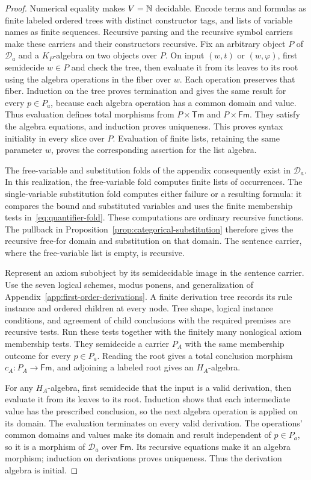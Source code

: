 \begin{proof}
Numerical equality makes $V=\mathbb N$ decidable. Encode terms and formulas
as finite labeled ordered trees with distinct constructor tags,
and lists of variable names as finite sequences. Recursive parsing
and the recursive symbol carriers make these carriers and their
constructors recursive. Fix an arbitrary object $P$ of $\mathcal D_a$
and a $K_P$-algebra on two objects over $P$. On input $(w,t)$ or
$(w,\varphi)$, first semidecide $w\in P$ and check the tree, then
evaluate it from its leaves to its root using the algebra operations
in the fiber over $w$. Each operation preserves that fiber.
Induction on the tree proves termination and gives the same result
for every $p\in P_a$, because each algebra operation has a common
domain and value. Thus evaluation defines total morphisms from
$P\times\mathsf{Tm}$ and $P\times\mathsf{Fm}$. They satisfy the algebra
equations, and induction
proves uniqueness. This proves syntax initiality in every slice
over $P$. Evaluation of finite lists, retaining the same parameter
$w$, proves the corresponding assertion for the list algebra.

The free-variable and substitution folds of the appendix consequently
exist in $\mathcal D_a$. In this realization, the free-variable fold
computes finite lists of occurrences. The single-variable
substitution fold computes either failure or a resulting formula:
it compares the bound and substituted variables and uses the finite
membership tests in~\eqref{eq:quantifier-fold}. These computations
are ordinary recursive functions. The pullback in
Proposition~\ref{prop:categorical-substitution} therefore gives the
recursive free-for domain and substitution on that domain. The
sentence carrier, where the free-variable list is empty, is recursive.

Represent an axiom subobject by its semidecidable image in the
sentence carrier. Use the seven logical schemes, modus ponens,
and generalization of Appendix~\ref{app:first-order-derivations}.
A finite derivation tree records its rule instance and ordered
children at every node. Tree shape, logical instance conditions,
and agreement of child conclusions with the required premises are
recursive tests. Run these tests together with the finitely many
nonlogical axiom membership tests. They semidecide a carrier
$P_A$ with the same membership outcome for every $p\in P_a$.
Reading the root gives a total conclusion morphism
$c_A:P_A\to\mathsf{Fm}$, and adjoining a labeled root gives an
$H_A$-algebra.

For any $H_A$-algebra, first semidecide that the input is a valid
derivation, then evaluate it from its leaves to its root. Induction
shows that each intermediate value has the prescribed conclusion,
so the next algebra operation is applied on its domain. The
evaluation terminates on every valid derivation. The operations'
common domains and values make its domain and result independent
of $p\in P_a$, so it is a morphism of $\mathcal D_a$ over
$\mathsf{Fm}$. Its recursive equations make it an algebra morphism;
induction on derivations proves uniqueness. Thus the derivation
algebra is initial.
\end{proof}

